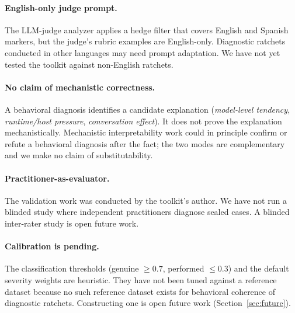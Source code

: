\paragraph{English-only judge prompt.}
The LLM-judge analyzer applies a hedge filter that covers English and
Spanish markers, but the judge's rubric examples are English-only.
Diagnostic ratchets conducted in other languages may need prompt
adaptation. We have not yet tested the toolkit against non-English
ratchets.

\paragraph{No claim of mechanistic correctness.}
A behavioral diagnosis identifies a candidate explanation
(\emph{model-level tendency}, \emph{runtime/host pressure},
\emph{conversation effect}). It does not prove the explanation
mechanistically. Mechanistic interpretability work could in principle
confirm or refute a behavioral diagnosis after the fact; the two
modes are complementary and we make no claim of substitutability.

\paragraph{Practitioner-as-evaluator.}
The validation work was conducted by the toolkit's author. We have
not run a blinded study where independent practitioners diagnose
sealed cases. A blinded inter-rater study is open future work.

\paragraph{Calibration is pending.}
The classification thresholds (genuine $\geq 0.7$, performed $\leq 0.3$)
and the default severity weights are heuristic. They have not been
tuned against a reference dataset because no such reference dataset
exists for behavioral coherence of diagnostic ratchets. Constructing
one is open future work (Section~\ref{sec:future}).
